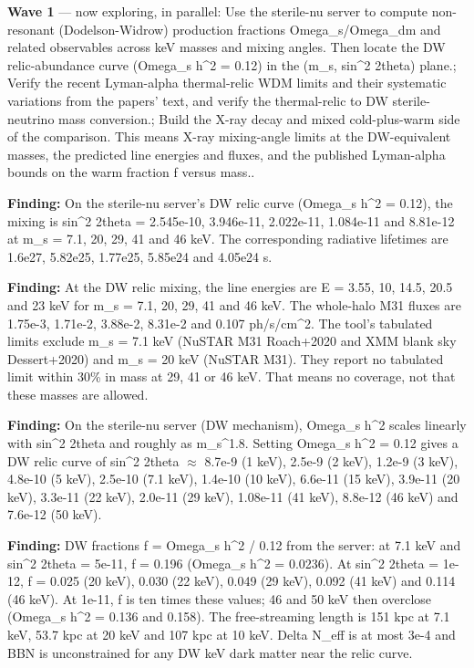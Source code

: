 \documentclass[11pt,a4paper]{article}
\begin{document}
\textbf{Wave 1} --- now exploring, in parallel: Use the sterile-nu server to compute non-resonant (Dodelson-Widrow) production fractions Omega\_s/Omega\_dm and related observables across keV masses and mixing angles. Then locate the DW relic-abundance curve (Omega\_s h\textasciicircum{}2 = 0.12) in the (m\_s, sin\textasciicircum{}2 2theta) plane.; Verify the recent Lyman-alpha thermal-relic WDM limits and their systematic variations from the papers' text, and verify the thermal-relic to DW sterile-neutrino mass conversion.; Build the X-ray decay and mixed cold-plus-warm side of the comparison. This means X-ray mixing-angle limits at the DW-equivalent masses, the predicted line energies and fluxes, and the published Lyman-alpha bounds on the warm fraction f versus mass..

\textbf{Finding:} On the sterile-nu server's DW relic curve (Omega\_s h\textasciicircum{}2 = 0.12), the mixing is sin\textasciicircum{}2 2theta = 2.545e-10, 3.946e-11, 2.022e-11, 1.084e-11 and 8.81e-12 at m\_s = 7.1, 20, 29, 41 and 46 keV. The corresponding radiative lifetimes are 1.6e27, 5.82e25, 1.77e25, 5.85e24 and 4.05e24 s.

\textbf{Finding:} At the DW relic mixing, the line energies are E = 3.55, 10, 14.5, 20.5 and 23 keV for m\_s = 7.1, 20, 29, 41 and 46 keV. The whole-halo M31 fluxes are 1.75e-3, 1.71e-2, 3.88e-2, 8.31e-2 and 0.107 ph/s/cm\textasciicircum{}2. The tool's tabulated limits exclude m\_s = 7.1 keV (NuSTAR M31 Roach+2020 and XMM blank sky Dessert+2020) and m\_s = 20 keV (NuSTAR M31). They report no tabulated limit within 30\% in mass at 29, 41 or 46 keV. That means no coverage, not that these masses are allowed.

\textbf{Finding:} On the sterile-nu server (DW mechanism), Omega\_s h\textasciicircum{}2 scales linearly with sin\textasciicircum{}2 2theta and roughly as m\_s\textasciicircum{}1.8. Setting Omega\_s h\textasciicircum{}2 = 0.12 gives a DW relic curve of sin\textasciicircum{}2 2theta $\approx$ 8.7e-9 (1 keV), 2.5e-9 (2 keV), 1.2e-9 (3 keV), 4.8e-10 (5 keV), 2.5e-10 (7.1 keV), 1.4e-10 (10 keV), 6.6e-11 (15 keV), 3.9e-11 (20 keV), 3.3e-11 (22 keV), 2.0e-11 (29 keV), 1.08e-11 (41 keV), 8.8e-12 (46 keV) and 7.6e-12 (50 keV).

\textbf{Finding:} DW fractions f = Omega\_s h\textasciicircum{}2 / 0.12 from the server: at 7.1 keV and sin\textasciicircum{}2 2theta = 5e-11, f = 0.196 (Omega\_s h\textasciicircum{}2 = 0.0236). At sin\textasciicircum{}2 2theta = 1e-12, f = 0.025 (20 keV), 0.030 (22 keV), 0.049 (29 keV), 0.092 (41 keV) and 0.114 (46 keV). At 1e-11, f is ten times these values; 46 and 50 keV then overclose (Omega\_s h\textasciicircum{}2 = 0.136 and 0.158). The free-streaming length is 151 kpc at 7.1 keV, 53.7 kpc at 20 keV and 107 kpc at 10 keV. Delta N\_eff is at most 3e-4 and BBN is unconstrained for any DW keV dark matter near the relic curve.
\end{document}
